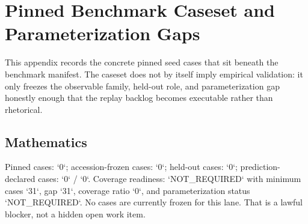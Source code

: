 \section{Pinned Benchmark Caseset and Parameterization Gaps}
\label{sec:oc-core-1-3-domain-benchmark-caseset}

This appendix records the concrete pinned seed cases that sit beneath the benchmark manifest. The caseset does not by itself imply empirical validation: it only freezes the observable family, held-out role, and parameterization gap honestly enough that the replay backlog becomes executable rather than rhetorical.

\subsection{Mathematics}
Pinned cases: `0`; accession-frozen cases: `0`; held-out cases: `0`; prediction-declared cases: `0` / `0`.
Coverage readiness: `NOT\_REQUIRED` with minimum cases `31`, gap `31`, coverage ratio `0`, and parameterization status `NOT\_REQUIRED`.
No cases are currently frozen for this lane. That is a lawful blocker, not a hidden open work item.

